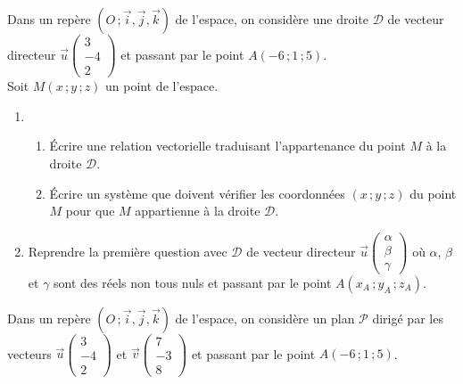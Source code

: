 \begin{activite}


  Dans un repère $(O\,;
  \overrightarrow{i},\overrightarrow{j},\overrightarrow{k})$ de
  l'espace, on considère une droite $\mathscr{D}$ de vecteur directeur
  $\overrightarrow{u} \begin {pmatrix} 3\\-4\\2 \end{pmatrix}$ et
  passant par le point $A(-6\,;1\,;5)$.\\
  Soit $M(x\,; y\,; z)$ un point de l'espace.

  \begin{enumerate}
  \item
    \begin{enumerate}
    \item Écrire une relation vectorielle traduisant l'appartenance du
      point $M$ à la droite $\mathscr{D}$.

    \item Écrire un système que doivent vérifier les coordonnées
      $(x\,;y\,;z)$ du point $M$ pour que $M$ appartienne à la droite
      $\mathscr{D}$.
    \end{enumerate}

  \item Reprendre la première question avec $\mathscr{D}$ de vecteur
    directeur
    $\vec{u} \begin {pmatrix} \alpha\\\beta\\\gamma \end{pmatrix}$ où
    $\alpha$, $\beta$ et $\gamma$ sont des réels non tous nuls et
    passant par le point $A(x_A\,;y_A\,;z_A)$.
  \end{enumerate}


  Dans un repère $(O\,;\vec{i}, \vec{j},\vec{k})$ de l'espace, on
  considère un plan $\mathscr{P}$ dirigé par les vecteurs
  $\vec{u} \begin {pmatrix} 3\\-4\\2 \end{pmatrix}$  et
  $\vec{v} \begin {pmatrix} 7\\-3\\8 \end{pmatrix}$ et passant par le
  point $A(-6\,; 1\,; 5)$.


\end{activite}
